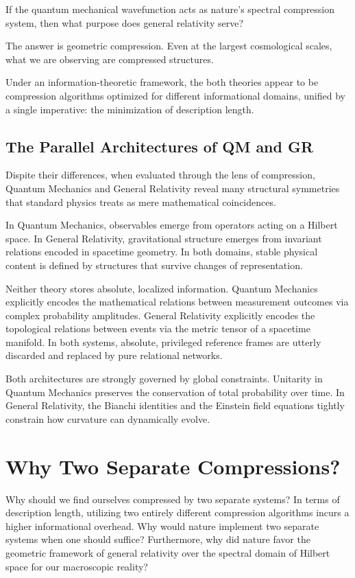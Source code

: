 If the quantum mechanical wavefunction acts as nature's spectral compression system, then what purpose does general relativity serve?

The answer is geometric compression. Even at the largest cosmological scales, what we are observing are compressed structures.

Under an information-theoretic framework, the both theories appear to be compression algorithms optimized for different informational domains, unified by a single imperative:
the minimization of description length.


\subsection*{The Parallel Architectures of QM and GR}

Dispite their differences, when evaluated through the lens of compression, Quantum Mechanics and General Relativity reveal many structural symmetries that standard physics treats as mere mathematical coincidences.

In Quantum Mechanics, observables emerge from operators acting on a Hilbert space.
In General Relativity, gravitational structure emerges from invariant relations encoded in spacetime geometry.
In both domains, stable physical content is defined by structures that survive changes of representation.

Neither theory stores absolute, localized information.
Quantum Mechanics explicitly encodes the mathematical relations between measurement outcomes via complex probability amplitudes.
General Relativity explicitly encodes the topological relations between events via the metric tensor of a spacetime manifold.
In both systems, absolute, privileged reference frames are utterly discarded and replaced by pure relational networks.

Both architectures are strongly governed by global constraints.
Unitarity in Quantum Mechanics preserves the conservation of total probability over time.
In General Relativity, the Bianchi identities and the Einstein field equations tightly constrain how curvature can dynamically evolve.


\section{Why Two Separate Compressions?}

Why should we find ourselves compressed by two separate systems? In terms of description length, utilizing two entirely different compression algorithms incurs a higher informational overhead.
Why would nature implement two separate systems when one should suffice? Furthermore, why did nature favor the geometric framework of general relativity over the spectral domain of Hilbert space for our macroscopic reality?

